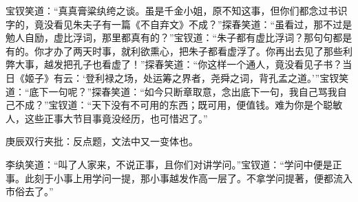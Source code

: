 \begin{parag}


    宝钗笑道：“真真膏粱纨绔之谈。虽是千金小姐，原不知这事，但你们都念过书识字的，竟没看见朱夫子有一篇《不自弃文》不成？”探春笑道：“虽看过，那不过是勉人自励，虚比浮词，那里都真有的？”宝钗道：“朱子都有虚比浮词？那句句都是有的。你才办了两天时事，就利欲熏心，把朱子都看虚浮了。你再出去见了那些利弊大事，越发把孔子也看虚了！”探春笑道：“你这样一个通人，竟没看见子书？当日《姬子》有云：‘登利禄之场，处运筹之界者，尧舜之词，背孔孟之道。’”宝钗笑道：“底下一句呢？”探春笑道：“如今只断章取意，念出底下一句，我自己骂我自己不成？”宝钗道：“天下没有不可用的东西；既可用，便值钱。难为你是个聪敏人，这些正事大节目事竟没经历，也可惜迟了。”\begin{note}庚辰双行夹批：反点题，文法中又一变体也。\end{note}李纨笑道：“叫了人家来，不说正事，且你们对讲学问。”宝钗道：“学问中便是正事。此刻于小事上用学问一提，那小事越发作高一层了。不拿学问提著，便都流入市俗去了。”
\end{parag}


